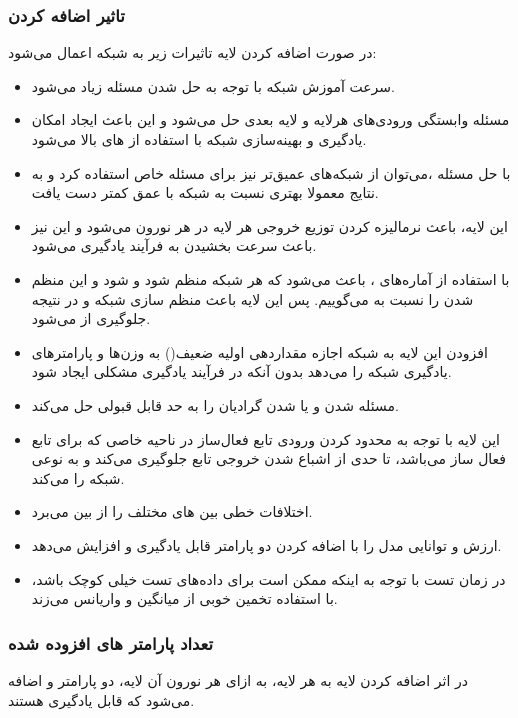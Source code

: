\documentclass{article}
\begin{document}
\subsubsection{تاثیر اضافه کردن }
در صورت اضافه کردن لایه  تاثیرات زیر به شبکه اعمال می‌شود:
\begin{itemize}
	\item سرعت آموزش شبکه با توجه به حل شدن مسئله  زیاد می‌شود.
	\item مسئله وابستگی ورودی‌های هرلایه و لایه بعدی حل می‌شود و این باعث ایجاد امکان یادگیری و بهینه‌سازی شبکه با استفاده از  ‌های بالا می‌شود.
	\item با حل مسئله ،‌می‌توان از شبکه‌‌های عمیق‌تر نیز برای مسئله خاص استفاده کرد و به نتایج معمولا بهتری نسبت به شبکه با عمق کمتر دست یافت.
	\item این لایه، باعث نرمالیزه کردن توزیع خروجی هر لایه در هر نورون می‌شود و این نیز باعث سرعت بخشیدن به فرآیند یادگیری می‌شود.
	\item با استفاده از آماره‌های ، باعث می‌شود که هر شبکه منظم شود و  شود و این منظم شدن را نسبت به  می‌گوییم. پس این لایه باعث منظم سازی شبکه و در نتیجه جلوگیری از  می‌شود.
	\item افزودن این لایه به شبکه اجازه مقداردهی اولیه ضعیف() به وزن‌ها و پارامتر‌های یادگیری شبکه را می‌دهد بدون آنکه در فرآیند یادگیری مشکلی ایجاد شود.
	\item مسئله شدن و یا شدن گرادیان را به حد قابل قبولی حل می‌کند.
	\item این لایه با توجه به محدود کردن ورودی تابع فعال‌ساز در ناحیه خاصی که برای تابع فعال ساز می‌باشد، تا حدی از اشباع شدن خروجی تابع جلوگیری می‌کند و به نوعی شبکه را  می‌کند.
	\item اختلافات خطی بین ‌های مختلف را از بین می‌برد.
	\item ارزش و توانایی مدل را با اضافه کردن دو پارامتر قابل یادگیری \lr{$\gamma$} و \lr{$\beta$} افزایش می‌دهد.
	\item در زمان تست با توجه به اینکه ممکن است  برای داده‌های تست خیلی کوچک باشد، با استفاده  تخمین خوبی از میانگین و واریانس  می‌زند.
\end{itemize}
\subsubsection{تعداد پارامتر های افزوده شده}
در اثر اضافه کردن لایه  به هر لایه، به ازای هر نورون آن لایه، دو پارامتر \lr{$\gamma$}و \lr{$\beta$} اضافه می‌شود که قابل یادگیری هستند.
\end{document}
